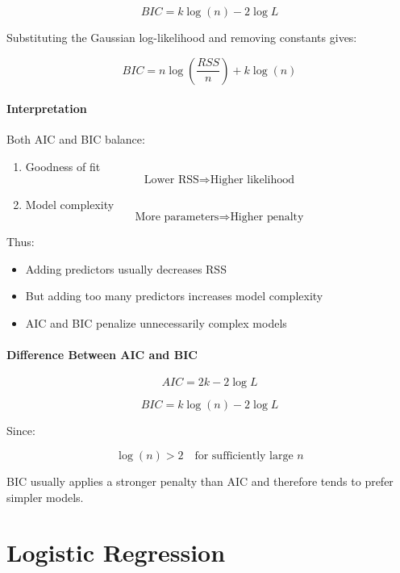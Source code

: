 \documentclass[10pt,a4paper]{article}
\begin{document}
	\[
	\boxed{
	BIC
	=
	k\log(n)-2\log L
	}
	\]
	
	Substituting the Gaussian log-likelihood and removing constants gives:
	
	\[
	\boxed{
	BIC
	=
	n\log\left(\frac{RSS}{n}\right)
	+
	k\log(n)
	}
	\]
	
	\vspace{0.5em}
	
	\paragraph{Interpretation}
	
	Both AIC and BIC balance:
	
	\begin{enumerate}
		\item Goodness of fit
		\[
		\text{Lower RSS} \Rightarrow \text{Higher likelihood}
		\]
	
		\item Model complexity
		\[
		\text{More parameters} \Rightarrow \text{Higher penalty}
		\]
	\end{enumerate}
	
	Thus:
	
	\begin{itemize}
		\item Adding predictors usually decreases RSS
		\item But adding too many predictors increases model complexity
		\item AIC and BIC penalize unnecessarily complex models
	\end{itemize}
	
	\vspace{0.5em}
	
	\paragraph{Difference Between AIC and BIC}
	
	\[
	AIC = 2k - 2\log L
	\]
	
	\[
	BIC = k\log(n) - 2\log L
	\]
	
	Since:
	
	\[
	\log(n) > 2
	\quad \text{for sufficiently large } n
	\]
	
	BIC usually applies a stronger penalty than AIC and therefore tends to prefer simpler models.
	
	
	\newpage

	\section{Logistic Regression}
\end{document}
